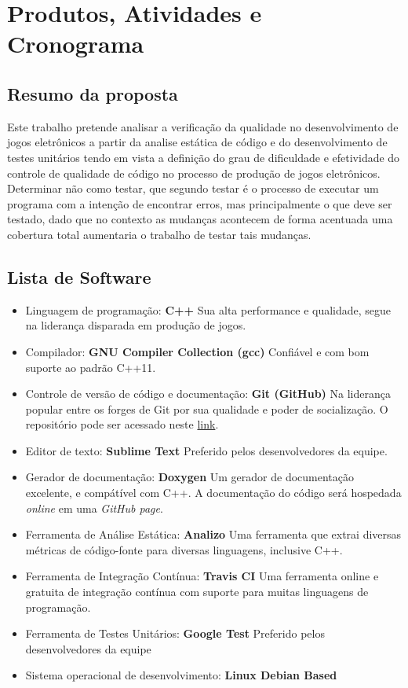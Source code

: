 \chapter[Produtos, Atividades e Cronograma]{Produtos, Atividades e Cronograma}

\section{Resumo da proposta}

Este trabalho pretende analisar a verificação da qualidade no desenvolvimento de jogos eletrônicos a partir da analise estática de código e do desenvolvimento de testes unitários tendo em vista a definição do grau de dificuldade e efetividade do controle de qualidade de código no processo de produção de jogos eletrônicos.
Determinar não como testar, que segundo  testar é o processo de executar um programa com a intenção de encontrar erros, mas principalmente o que deve ser testado, dado que no contexto as mudanças acontecem de forma acentuada uma cobertura total aumentaria o trabalho de testar tais mudanças.

\section{Lista de Software}

\begin{itemize}
\item{Linguagem de programação:} \textbf{C++}
Sua alta performance e qualidade, segue na liderança disparada em produção de jogos.
\item{Compilador:} \textbf{GNU Compiler Collection (gcc)}
Confiável e com bom suporte ao padrão C++11.
\item{Controle de versão de código e documentação:} \textbf{Git (GitHub)}
Na liderança popular entre os forges de Git por sua qualidade e poder de socialização. O repositório pode ser acessado neste \href{https://github.com/CaioIcy/Dauphine}{link}.
\item{Editor de texto:} \textbf{Sublime Text}
Preferido pelos desenvolvedores da equipe.
\item{Gerador de documentação:} \textbf{Doxygen}
Um gerador de documentação excelente, e compátível com C++. A documentação do código será hospedada \textit{online} em uma \textit{GitHub page}.
\item{Ferramenta de Análise Estática:} \textbf{Analizo}
Uma ferramenta que extrai diversas métricas de código-fonte para diversas linguagens, inclusive C++.
\item{Ferramenta de Integração Contínua:} \textbf{Travis CI}
Uma ferramenta online e gratuita de integração contínua com suporte para muitas linguagens de programação.
\item{Ferramenta de Testes Unitários:} \textbf{Google Test}
Preferido pelos desenvolvedores da equipe
\item{Sistema operacional de desenvolvimento:} \textbf{Linux Debian Based}
\end{itemize}

